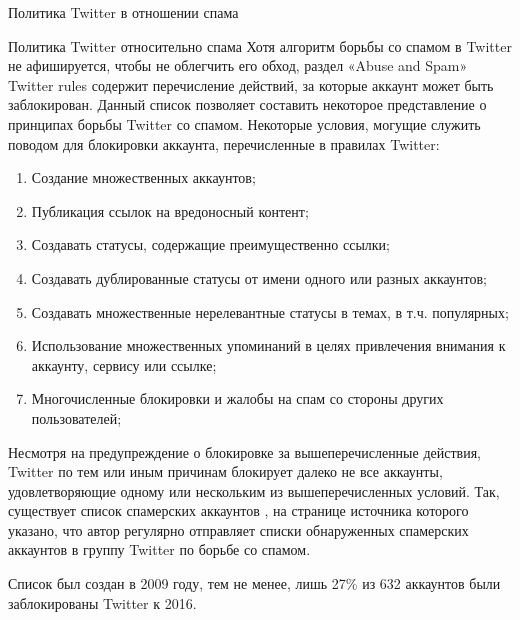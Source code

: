 \begin{section}{Политика Twitter в отношении спама}
\begin{subsection}{Политика Twitter относительно спама}
Хотя алгоритм борьбы со спамом в Twitter не афишируется,
чтобы не облегчить его обход, раздел «Abuse and Spam»
Twitter rules \cite{TwitterRules}
содержит перечисление действий,
за которые аккаунт может быть заблокирован.
Данный список позволяет составить некоторое представление о принципах борьбы Twitter со спамом. Некоторые условия, могущие служить поводом для блокировки аккаунта, перечисленные в правилах Twitter:
\begin{enumerate}
  \item Создание множественных аккаунтов;
  \item Публикация ссылок на вредоносный контент;
  \item Создавать статусы, содержащие преимущественно ссылки;
  \item Создавать дублированные статусы от имени одного или разных аккаунтов;
  \item Создавать множественные нерелевантные статусы в темах, в т.ч. популярных;
  \item Использование множественных упоминаний в целях привлечения внимания к аккаунту,
  сервису или ссылке;
  \item  Многочисленные блокировки и жалобы на спам со стороны других пользователей;
\end{enumerate}

Несмотря на предупреждение о блокировке за вышеперечисленные действия, Twitter по тем или иным причинам блокирует далеко не все аккаунты, удовлетворяющие одному или нескольким из вышеперечисленных условий. Так, существует список спамерских аккаунтов \cite{TwitterSpammers}, на странице источника которого указано, что автор регулярно отправляет списки обнаруженных спамерских аккаунтов в группу Twitter по борьбе со спамом.

Список был создан в 2009 году, тем не менее, лишь 27\% из 632 аккаунтов были заблокированы Twitter к 2016.

\end{subsection}




\end{section}
